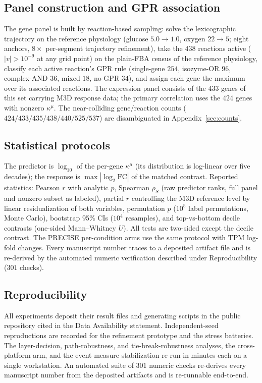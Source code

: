 \documentclass[11pt,a4paper]{article}
\theoremstyle{plain}
\theoremstyle{definition}
\theoremstyle{remark}
\newcommand{\kmu}{\kappa^{\mu}}
\begin{document}
\subsection{Panel construction and GPR association}

The gene panel is built by reaction-based sampling: solve the lexicographic trajectory on the reference physiology (glucose $5.0 \to
1.0$, oxygen $22 \to 5$; eight anchors, $8\times$ per-segment
trajectory refinement), take the $438$ reactions active
($|v| > 10^{-9}$ at any grid point) on the plain-FBA census of the
reference physiology,
classify each active reaction's GPR rule (single-gene $254$,
isozyme-OR $96$, complex-AND $36$, mixed $18$, no-GPR $34$), and
assign each gene the maximum over its associated reactions. The expression panel consists of the $433$ genes of this set carrying M3D response
data; the primary correlation uses the $424$ genes with nonzero
$\kmu$. The near-colliding gene/reaction counts
($424/433/435/438/440/525/537$) are disambiguated in Appendix~\ref{sec:counts}.

\subsection{Statistical protocols}

The predictor is $\log_{10}$ of the per-gene $\kmu$ (its
distribution is log-linear over five decades); the response is
$\max|\log_2 \mathrm{FC}|$ of the matched contrast. Reported
statistics: Pearson $r$ with analytic $p$, Spearman $\rho_S$
(raw predictor ranks, full panel and nonzero subset as labeled),
partial $r$ controlling the M3D reference level by linear
residualization of both variables, permutation $p$ ($10^5$
label permutations, Monte Carlo), bootstrap 95\% CIs ($10^4$
resamples), and top-vs-bottom decile contrasts (one-sided
Mann--Whitney $U$). All tests are two-sided except the decile
contrast. The PRECISE per-condition arms use the same protocol
with TPM log-fold changes. Every manuscript number traces to a deposited artifact file and is re-derived by the automated numeric verification described under Reproducibility ($301$ checks).

\subsection{Reproducibility}

All experiments deposit their result files and generating
scripts in the public repository cited in the Data Availability
statement. Independent-seed reproductions are recorded for the
refinement prototype and the stress batteries. The layer-decision,
path-robustness, and tie-break-robustness analyses, the cross-platform
arm, and the event-measure stabilization re-run in minutes each on a
single workstation. An automated suite of $301$ numeric checks
re-derives every manuscript number from the deposited artifacts and
is re-runnable end-to-end.
\end{document}
